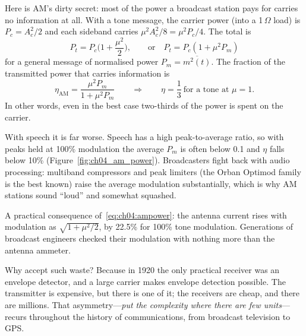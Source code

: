 Here is AM's dirty secret: most of the power a broadcast station pays for carries no information at all.
With a tone message, the carrier power (into a 1\,$\Omega$ load) is $P_c=A_c^2/2$ and each sideband
carries $\mu^2A_c^2/8=\mu^2P_c/4$. The total is
\begin{equation}
P_t=P_c\Big(1+\frac{\mu^2}{2}\Big),\qquad\text{or}\quad P_t=P_c(1+\mu^2P_m)
\label{eq:ch04:ampower}
\end{equation}
for a general message of normalised power $P_m=\overline{m^2(t)}$. The fraction of the transmitted
power that carries information is
\begin{equation}
\eta_{\text{AM}}=\frac{\mu^2P_m}{1+\mu^2P_m}\qquad\Longrightarrow\qquad
\eta=\frac{1}{3}\ \text{for a tone at }\mu=1.
\label{eq:ch04:ameff}
\end{equation}
In other words, even in the best case two-thirds of the power is spent on the carrier.


With speech it is far worse. Speech has a high peak-to-average ratio, so with peaks held at 100\%
modulation the average $P_m$ is often below 0.1 and $\eta$ falls below 10\%
(Figure~\ref{fig:ch04_am_power}). Broadcasters fight back with audio processing: multiband compressors
and peak limiters (the Orban Optimod family is the best known) raise the average modulation
substantially, which is why AM stations sound ``loud'' and somewhat squashed.

A practical consequence of~\eqref{eq:ch04:ampower}: the antenna current rises with modulation as
$\sqrt{1+\mu^2/2}$, by 22.5\% for 100\% tone modulation. Generations of broadcast engineers checked
their modulation with nothing more than the antenna ammeter.

Why accept such waste? Because in 1920 the only practical receiver was an envelope detector, and a
large carrier makes envelope detection possible. The transmitter is expensive, but there is one of it;
the receivers are cheap, and there are millions. That asymmetry---\emph{put the complexity where there
are few units}---recurs throughout the history of communications, from broadcast television to GPS.

